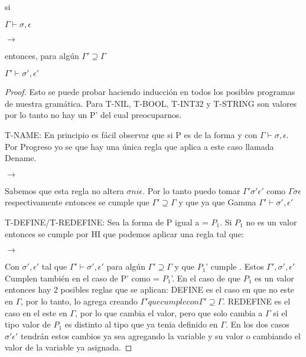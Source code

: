 \begin{theorem}[Preservacion]
    si


    $\Gamma \vdash \sigma, \epsilon$

      $\rightarrow$  

    entonces, para algún $\Gamma' \supseteq  \Gamma$


    $\Gamma' \vdash \sigma', \epsilon'$

\end{theorem}

\begin{proof}
Esto se puede probar haciendo inducción en todos los posibles programas de nuestra
gramática. Para T-NIL, T-BOOL, T-INT32 y T-STRING son valores por lo tanto no hay un P' del cual preocuparnos.

T-NAME: En principio es fácil observar que si P es de la forma  y  con $\Gamma \vdash \sigma, \epsilon$.
Por Progreso yo se que hay una única regla que aplica a este caso llamada Dename.

  $\rightarrow$  

Sabemos que esta regla no altera $\sigma ni \epsilon$.
Por lo tanto puedo tomar $\Gamma' \sigma' \epsilon'$ como $\Gamma \sigma \epsilon$ respectivamente entonces se cumple que $\Gamma' \supseteq  \Gamma$
y que  ya que Gamma $\Gamma' \vdash \sigma', \epsilon'$

T-DEFINE/T-REDEFINE: Sea la forma de P igual a   = $P_{1}$. Si $P_{1}$ no es un valor entonces se cumple por HI que podemos aplicar una regla tal que:

  $\rightarrow$ 

Con $\sigma', \epsilon'$ tal que $\Gamma' \vdash \sigma', \epsilon'$ para algún $\Gamma' \supseteq  \Gamma$ y que $P_{1}$' cumple .
Estos $\Gamma', \sigma', \epsilon'$ Cumplen también en el caso de P' como  = $P_{1}$'.
En el caso de  que $P_{1}$ es un valor entonces hay 2 posibles reglas que se aplican:
DEFINE es el caso en que  no este en $\Gamma$, por lo tanto, lo agrega creando $\Gamma' que cumple con \Gamma' \supseteq  \Gamma$.
REDEFINE es el caso en el  este en $\Gamma$, por lo que cambia el valor, pero que solo cambia a $\Gamma$ si el tipo valor de $P_{1}$ es distinto
al tipo que ya tenia definido en $\Gamma$. En los dos casos $\sigma' \epsilon'$ tendrán estos cambios ya sea agregando la variable y su valor o cambiando el valor
de la variable ya asignada.


\end{proof}
